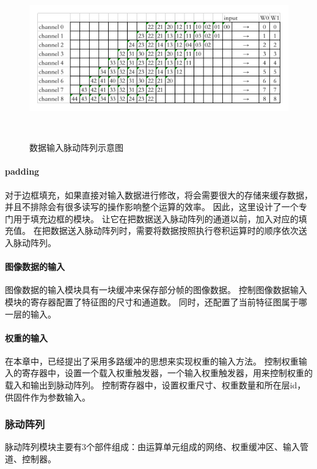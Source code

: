 \begin{figure}[htbp]
    \centering
    \includegraphics[width=15cm,height=7cm]{figures/input_systolic_array.png}
    \caption{数据输入脉动阵列示意图}
    \label{fig:systolic_data}
\end{figure}

\paragraph{padding}
对于边框填充，如果直接对输入数据进行修改，将会需要很大的存储来缓存数据，并且不排除会有很多读写的操作影响整个运算的效率。
因此，这里设计了一个专门用于填充边框的模块。
让它在把数据送入脉动阵列的通道以前，加入对应的填充值。
在把数据送入脉动阵列时，需要将数据按照执行卷积运算时的顺序依次送入脉动阵列。



\paragraph{图像数据的输入}
图像数据的输入模块具有一块缓冲来保存部分帧的图像数据。
控制图像数据输入模块的寄存器配置了特征图的尺寸和通道数。
同时，还配置了当前特征图属于哪一层的输入。


\paragraph{权重的输入}
在本章中，已经提出了采用多路缓冲的思想来实现权重的输入方法。
控制权重输入的寄存器中，设置一个载入权重触发器，一个输入权重触发器，用来控制权重的载入和输出到脉动阵列。
控制寄存器中，设置权重尺寸、权重数量和所在层id，供固件作为参数输入。


\subsubsection{脉动阵列}
脉动阵列模块主要有3个部件组成：由运算单元组成的网络、权重缓冲区、输入管道、控制器。

